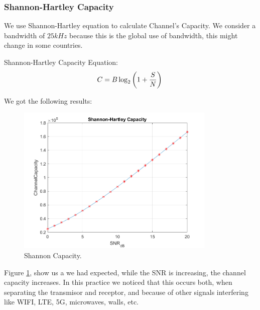 \subsubsection{Shannon-Hartley Capacity}
We use Shannon-Hartley equation to calculate Channel's Capacity. We consider a bandwidth of $25 kHz$ because this is the global use of bandwidth, this might change in some countries. \cite{teleradio_2020}

Shannon-Hartley Capacity Equation:
\begin{equation}
	C = B\log_{2}\left(1+\frac{S}{N}\right)\\
\end{equation}

We got the following results:

\begin{figure}[!htbp]
	\centering
	\includegraphics[width=9.5cm]{images/shannon_capacity.png}
	\caption{Shannon Capacity.}
	\label{fig:shannon}
\end{figure}

Figure \ref{fig:shannon}, show us a we had expected, while the SNR is increasing, the channel capacity increases. 
In this practice we noticed that this occurs both, when separating the transmisor and receptor, and because  of  other signals interfering like WIFI, LTE, 5G, microwaves, walls, etc. 
